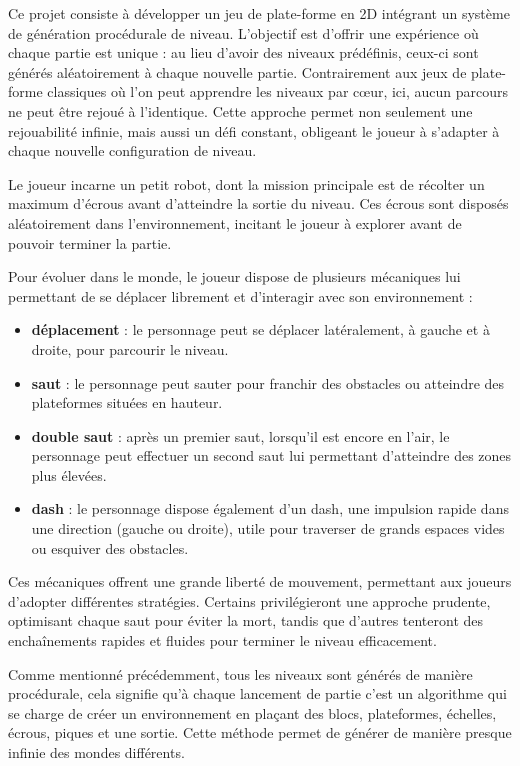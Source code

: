 \documentclass[10pt]{report}
\begin{document}
Ce projet consiste à développer un jeu de plate-forme en 2D intégrant un système de génération procédurale de niveau. L’objectif est d’offrir une expérience où chaque partie est unique : au lieu d’avoir des niveaux prédéfinis, ceux-ci sont générés aléatoirement à chaque nouvelle partie. Contrairement aux jeux de plate-forme classiques où l'on peut apprendre les niveaux par cœur, ici, aucun parcours ne peut être rejoué à l’identique. Cette approche permet non seulement une rejouabilité infinie, mais aussi un défi constant, obligeant le joueur à s’adapter à chaque nouvelle configuration de niveau.

Le joueur incarne un petit robot, dont la mission principale est de récolter un maximum d’écrous avant d’atteindre la sortie du niveau. Ces écrous sont disposés aléatoirement dans l’environnement, incitant le joueur à explorer avant de pouvoir terminer la partie.

Pour évoluer dans le monde, le joueur dispose de plusieurs mécaniques lui permettant de se déplacer librement et d’interagir avec son environnement :
\begin{itemize}
  \item \textbf{déplacement} : le personnage peut se déplacer latéralement, à gauche et à droite, pour parcourir le niveau.
  \item \textbf{saut} : le personnage peut sauter pour franchir des obstacles ou atteindre des plateformes situées en hauteur.
  \item \textbf{double saut} : après un premier saut, lorsqu'il est encore en l’air, le personnage peut effectuer un second saut lui permettant d’atteindre des zones plus élevées.
  \item \textbf{dash} : le personnage dispose également d’un dash, une impulsion rapide dans une direction (gauche ou droite), utile pour traverser de grands espaces vides ou esquiver des obstacles.\\
\end{itemize}

Ces mécaniques offrent une grande liberté de mouvement, permettant aux joueurs d’adopter différentes stratégies. Certains privilégieront une approche prudente, optimisant chaque saut pour éviter la mort, tandis que d’autres tenteront des enchaînements rapides et fluides pour terminer le niveau efficacement.


Comme mentionné précédemment, tous les niveaux sont générés de manière procédurale, cela signifie qu'à chaque lancement de partie c'est un algorithme qui se charge de créer un environnement en plaçant des blocs, plateformes, échelles, écrous, piques et une sortie. Cette méthode permet de générer de manière presque infinie des mondes différents. 
\end{document}
